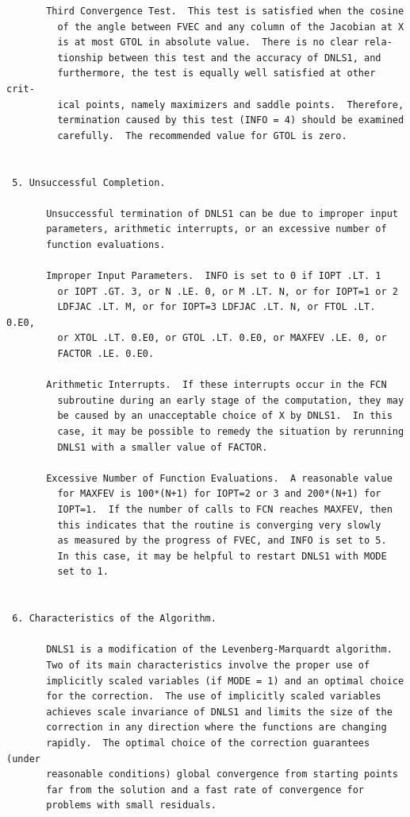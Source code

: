 \documentclass[11pt,twoside]{article}
\begin{document}
\begin{verbatim}
       Third Convergence Test.  This test is satisfied when the cosine
         of the angle between FVEC and any column of the Jacobian at X
         is at most GTOL in absolute value.  There is no clear rela-
         tionship between this test and the accuracy of DNLS1, and
         furthermore, the test is equally well satisfied at other crit-
         ical points, namely maximizers and saddle points.  Therefore,
         termination caused by this test (INFO = 4) should be examined
         carefully.  The recommended value for GTOL is zero.


 5. Unsuccessful Completion.

       Unsuccessful termination of DNLS1 can be due to improper input
       parameters, arithmetic interrupts, or an excessive number of
       function evaluations.

       Improper Input Parameters.  INFO is set to 0 if IOPT .LT. 1
         or IOPT .GT. 3, or N .LE. 0, or M .LT. N, or for IOPT=1 or 2
         LDFJAC .LT. M, or for IOPT=3 LDFJAC .LT. N, or FTOL .LT. 0.E0,
         or XTOL .LT. 0.E0, or GTOL .LT. 0.E0, or MAXFEV .LE. 0, or
         FACTOR .LE. 0.E0.

       Arithmetic Interrupts.  If these interrupts occur in the FCN
         subroutine during an early stage of the computation, they may
         be caused by an unacceptable choice of X by DNLS1.  In this
         case, it may be possible to remedy the situation by rerunning
         DNLS1 with a smaller value of FACTOR.

       Excessive Number of Function Evaluations.  A reasonable value
         for MAXFEV is 100*(N+1) for IOPT=2 or 3 and 200*(N+1) for
         IOPT=1.  If the number of calls to FCN reaches MAXFEV, then
         this indicates that the routine is converging very slowly
         as measured by the progress of FVEC, and INFO is set to 5.
         In this case, it may be helpful to restart DNLS1 with MODE
         set to 1.


 6. Characteristics of the Algorithm.

       DNLS1 is a modification of the Levenberg-Marquardt algorithm.
       Two of its main characteristics involve the proper use of
       implicitly scaled variables (if MODE = 1) and an optimal choice
       for the correction.  The use of implicitly scaled variables
       achieves scale invariance of DNLS1 and limits the size of the
       correction in any direction where the functions are changing
       rapidly.  The optimal choice of the correction guarantees (under
       reasonable conditions) global convergence from starting points
       far from the solution and a fast rate of convergence for
       problems with small residuals.


\end{verbatim}
\end{document}
